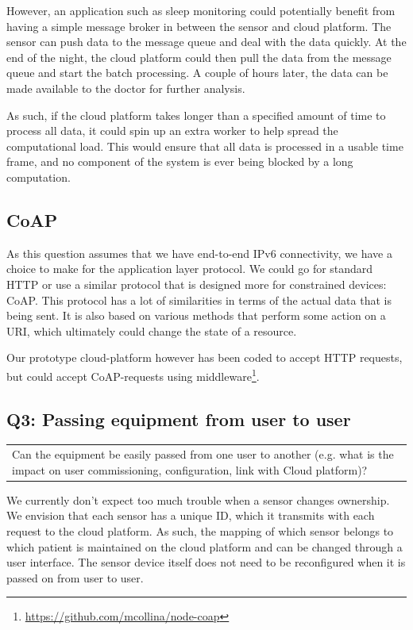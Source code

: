\documentclass[12pt, a4paper]{article}
\newenvironment{question}
    {\begin{center}
    \begin{tabular}{p{0.9\textwidth}}
    }
    {
    \end{tabular} 
    \end{center}
    }
\newcommand{\ipvsix}{IPv6}
\newcommand{\http}{HTTP}
\newcommand{\coap}{CoAP}
\newcommand{\uri}{URI}
\begin{document}
However, an application such as sleep monitoring could potentially benefit from having a simple message broker in between the sensor and cloud platform. The sensor can push data to the message queue and deal with the data quickly. At the end of the night, the cloud platform could then pull the data from the message queue and start the batch processing. A couple of hours later, the data can be made available to the doctor for further analysis.

As such, if the cloud platform takes longer than a specified amount of time to process all data, it could spin up an extra worker to help spread the computational load. This would ensure that all data is processed in a usable time frame, and no component of the system is ever being blocked by a long computation.

\subsection{\coap{}}

As this question assumes that we have end-to-end \ipvsix{} connectivity, we have a choice to make for the application layer protocol. We could go for standard \http{} or use a similar protocol that is designed more for constrained devices: \coap{}. This protocol has a lot of similarities in terms of the actual data that is being sent. It is also based on various methods that perform some action on a \uri{}, which ultimately could change the state of a resource.

Our prototype cloud-platform however has been coded to accept \http{} requests, but could accept \coap{}-requests using middleware\footnote{\url{https://github.com/mcollina/node-coap}}.

\subsection{Q3: Passing equipment from user to user}

\begin{question}
Can the equipment be easily passed from one user to another (e.g. what is the impact on user commissioning, configuration, link with Cloud platform)?
\end{question}

We currently don't expect too much trouble when a sensor changes ownership. We envision that each sensor has a unique ID, which it transmits with each request to the cloud platform. As such, the mapping of which sensor belongs to which patient is maintained on the cloud platform and can be changed through a user interface. The sensor device itself does not need to be reconfigured when it is passed on from user to user.
\end{document}
